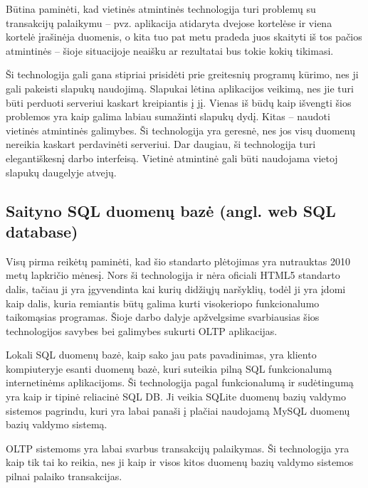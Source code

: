 \documentclass[12pt,a4paper,titlepage]{article}
\begin{document}
Būtina paminėti, kad vietinės atmintinės technologija turi problemų su transakcijų palaikymu – pvz. aplikacija atidaryta dvejose kortelėse ir viena kortelė įrašinėja duomenis, o kita tuo pat metu pradeda juos skaityti iš tos pačios atmintinės – šioje situacijoje neaišku ar rezultatai bus tokie kokių tikimasi.

Ši technologija gali gana stipriai prisidėti prie greitesnių programų kūrimo, nes ji gali pakeisti slapukų naudojimą. Slapukai lėtina aplikacijos veikimą, nes jie turi būti perduoti serveriui kaskart kreipiantis į jį. Vienas iš būdų kaip išvengti šios problemos yra kaip galima labiau sumažinti slapukų dydį. Kitas – naudoti vietinės atmintinės galimybes. Ši technologija yra geresnė, nes jos visų duomenų nereikia kaskart perdavinėti serveriui. Dar daugiau, ši technologija turi elegantiškesnį darbo interfeisą. Vietinė atmintinė gali būti naudojama vietoj slapukų daugelyje atvejų.


\subsection{Saityno SQL duomenų bazė (angl. web SQL database)}

Visų pirma reikėtų paminėti, kad šio standarto plėtojimas yra nutrauktas 2010 metų lapkričio mėnesį. Nors ši technologija ir nėra oficiali HTML5 standarto dalis, tačiau ji yra įgyvendinta kai kurių didžiųjų naršyklių, todėl ji yra įdomi kaip dalis, kuria remiantis būtų galima kurti visokeriopo funkcionalumo taikomąsias programas. Šioje darbo dalyje apžvelgsime svarbiausias šios technologijos savybes bei galimybes sukurti OLTP aplikacijas.

Lokali SQL duomenų bazė, kaip sako jau pats pavadinimas, yra kliento kompiuteryje esanti duomenų bazė, kuri suteikia pilną SQL funkcionalumą internetinėms aplikacijoms. Ši technologija pagal funkcionalumą ir sudėtingumą yra kaip ir tipinė reliacinė SQL DB. Ji veikia SQLite duomenų bazių valdymo sistemos pagrindu, kuri yra labai panaši į plačiai naudojamą MySQL duomenų bazių valdymo sistemą.

OLTP sistemoms yra labai svarbus transakcijų palaikymas. Ši technologija yra kaip tik tai ko reikia, nes ji kaip ir visos kitos duomenų bazių valdymo sistemos pilnai palaiko transakcijas. 
\end{document}
